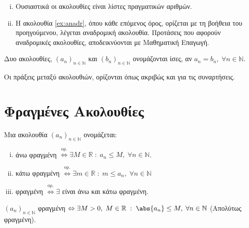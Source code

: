 \documentclass[main.tex]{subfiles}
\begin{document}
\begin{rem}
\item {}
    \begin{enumerate}[i)]
        \item Ουσιαστικά οι ακολουθίες είναι λίστες πραγματικών αριθμών.
        \item Η ακολουθία \ref{ex:anadr}, όπου κάθε επόμενος όρος,
            ορίζεται με τη βοήθεια του προηγούμενου, λέγεται αναδρομική 
            ακολουθία. Προτάσεις που αφορούν αναδρομικές ακολουθίες, 
            αποδεικνύονται με Μαθηματική Επαγωγή.
    \end{enumerate}
\end{rem}


\begin{dfn}
    Δυο ακολουθίες, $(a_{n})_{n \in \mathbb{N}}$  και $ (b_{n})_{n \in 
    \mathbb{N}} $ ονομάζονται ίσες, αν $ a_{n} = b_{n}, \; \forall n 
    \in \mathbb{N} $.
\end{dfn}

\begin{dfn}
    Οι πράξεις μεταξύ ακολουθιών, ορίζονται όπως ακριβώς και για τις 
    συναρτήσεις.
\end{dfn}

\section{Φραγμένες Ακολουθίες}

\begin{dfn}
\item {}
    Μια ακολουθία $ (a_{n})_{n \in \mathbb{N}} $ ονομάζεται:
    \begin{enumerate}[i)]
        \item άνω φραγμένη $ \overset{\text{ορ.}}{\Leftrightarrow} \exists 
            M \in 
            \mathbb{R} \; : \; a_{n} \leq M, \; \forall n \in \mathbb{N}$.
        \item κάτω φραγμένη $ \overset{\text{ορ.}}{\Leftrightarrow} \exists 
            m \in 
            \mathbb{R} \; : \; m \leq a_{n}, \; \forall n \in \mathbb{N}  $
        \item φραγμένη $ \overset{\text{ορ.}}{\Leftrightarrow} \exists$ 
            είναι άνω και κάτω φραγμένη.
    \end{enumerate}

    \begin{prop}
        $ (a_{n})_{n \in \mathbb{N}} $ φραγμένη $ \Leftrightarrow \exists 
        M>0, \; M \in \mathbb{R} \; : \; \abs{a_{n}} \leq M, \; \forall 
        n \in \mathbb{N} $
        (Απολύτως φραγμένη).
    \end{prop}
\end{dfn}
\end{document}
